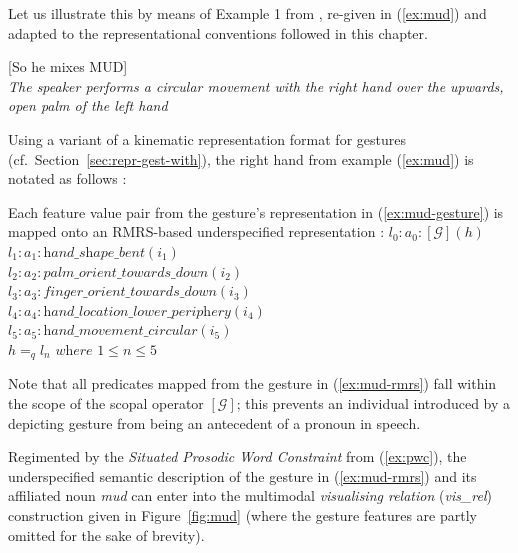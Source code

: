 \documentclass[output=paper,biblatex,babelshorthands,newtxmath,draftmode,colorlinks,citecolor=brown]{langscibook}
\begin{document}
Let us illustrate this by means of Example 1 from \citet[]{Alahverdzhieva:Lascarides:Flickinger:2017}, re-given in (\ref{ex:mud}) and adapted to the representational conventions followed in this chapter. 

\eanoraggedright 
\label{ex:mud}
{[So he mixes MUD]} \\
{\textit{The speaker performs a circular movement with the right hand over the upwards, open palm of the left hand}} 
\z

Using a variant of a kinematic representation format for gestures (cf.\ Section~\ref{sec:repr-gest-with}), the right hand from example (\ref{ex:mud}) is notated as follows \citep[]{Alahverdzhieva:Lascarides:Flickinger:2017}:
%
\ea \label{ex:mud-gesture}
\z

\largerpage
\noindent Each feature value pair from the gesture's representation in (\ref{ex:mud-gesture}) is mapped onto an RMRS-based underspecified representation \citep[]{Alahverdzhieva:Lascarides:Flickinger:2017}:
%
\ea \label{ex:mud-rmrs}
$l_0 : a_0 : [\mathcal{G}](h)$ \\
$l_1 : a_1 : \textit{hand\_shape\_bent}(i_1)$ \\
$l_2 : a_2 : \textit{palm\_orient\_towards\_down}(i_2)$ \\
$l_3 : a_3 : \textit{finger\_orient\_towards\_down}(i_3)$ \\
$l_4 : a_4 : \textit{hand\_location\_lower\_periphery}(i_4)$ \\
$l_5 : a_5 : \textit{hand\_movement\_circular}(i_5)$ \\
$h =_q l_n \textit{ where } 1 \leq n \leq 5$
\z

\noindent Note that all predicates mapped from the gesture in (\ref{ex:mud-rmrs}) fall within the scope of the scopal operator $[\mathcal{G}]$; this prevents an individual introduced by a depicting gesture from being an antecedent of a pronoun in speech.

Regimented by the \emph{Situated Prosodic Word Constraint} from (\ref{ex:pwc}), the underspecified semantic description of the gesture in (\ref{ex:mud-rmrs}) and its affiliated noun \textit{mud} can enter into the multimodal \emph{visualising relation} (\textit{vis\_rel}) construction given in Figure~\ref{fig:mud} (where the gesture features are partly omitted for the sake of brevity).
\end{document}
